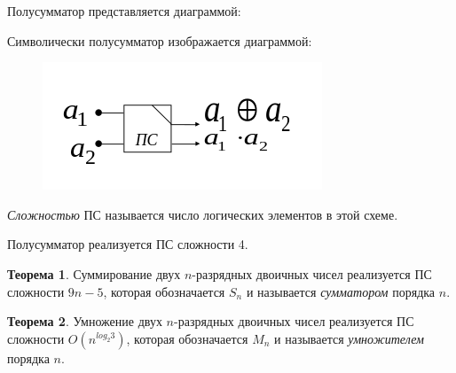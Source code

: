 Полусумматор представляется диаграммой:

\begin{figure}[H]
    \centering
\end{figure}

Символически полусумматор изображается диаграммой:

\begin{figure}[H]
    \centering
    \includegraphics[scale=0.5]{графика/polusum.png}
\end{figure}

\dftion \textit{Сложностью} ПС называется число логических элементов в этой схеме.

Полусумматор реализуется ПС сложности 4.

\textbf{Теорема 1}. Суммирование двух $n$-разрядных двоичных чисел реализуется ПС сложности $9n-5$, которая обозначается $S_n$ и называется \textit{сумматором} порядка $n$.

\textbf{Теорема 2}. Умножение двух $n$-разрядных двоичных чисел реализуется ПС сложности $O(n^{log_2 3})$, которая обозначается $M_n$ и называется \textit{умножителем} порядка $n$.